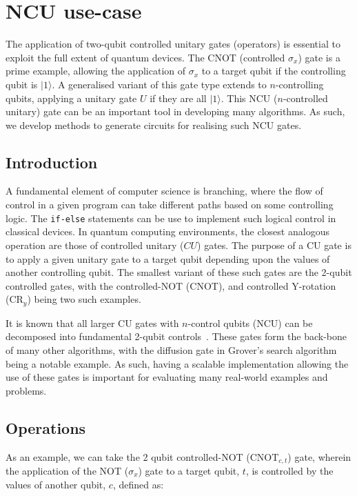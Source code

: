 \section{NCU use-case}
The application of two-qubit controlled unitary gates (operators) is essential to exploit the full extent of quantum devices. The CNOT (controlled $\sigma_x$) gate is a prime example, allowing the application of $\sigma_x$ to a target qubit if the controlling qubit is $\vert 1 \rangle$. A generalised variant of this gate type extends to $n$-controlling qubits, applying a unitary gate $U$ if they are all $\vert 1 \rangle$. This NCU ($n$-controlled unitary) gate can be an important tool in developing many algorithms. As such, we develop methods to generate circuits for realising such NCU gates.

\subsection{Introduction}
A fundamental element of computer science is branching, where the flow of control in a given program can take different paths based on some controlling logic. The \verb+if-else+ statements can be use to implement such logical control in classical devices. In quantum computing environments, the closest analogous operation are those of controlled unitary ($CU$) gates. The purpose of a CU gate is to apply a given unitary gate to a target qubit depending upon the values of another controlling qubit. The smallest variant of these such gates are the 2-qubit controlled gates, with the controlled-NOT (CNOT), and controlled Y-rotation (CR$_{y}$) being two such examples. 

It is known that all larger CU gates with $n$-control qubits (NCU) can be decomposed into fundamental 2-qubit controls~\cite{barenco_elementary_1995}. These gates form the back-bone of many other algorithms, with the diffusion gate in Grover's search algorithm~\cite{grover_1996} being a notable example. As such, having a scalable implementation allowing the use of these gates is important for evaluating many real-world examples and problems.

\subsection{Operations}
As an example, we can take the 2 qubit controlled-NOT ($\textrm{CNOT}_{c,t}$) gate, wherein the application of the NOT ($\sigma_x$) gate to a target qubit, $t$, is controlled by the values of another qubit, $c$, defined as:


